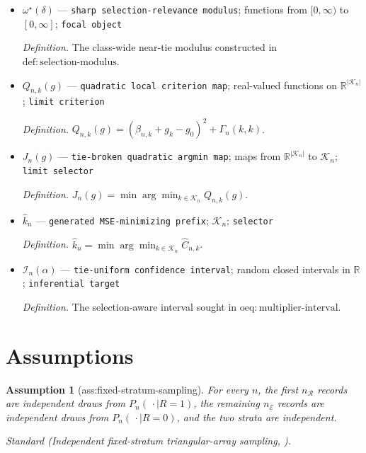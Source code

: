 \documentclass{article}
\newtheorem{assumption}{Assumption}
\begin{document}
\begin{itemize}
  \par\smallskip\noindent\emph{Definition.} \(d_n(k,l)=\|h_{n,k}-h_{n,l}\|_n=\{(\beta_{n,k}-\beta_{n,l})^2+\Gamma_n(k,k)+\Gamma_n(l,l)-2\Gamma_n(k,l)\}^{1/2}\).
  \item \(\omega^{\star}(\delta)\) --- \texttt{sharp selection-\allowbreak{}relevance modulus}; functions from \([0,\infty)\) to \([0,\infty]\); \texttt{focal object}
  \par\smallskip\noindent\emph{Definition.} The class-wide near-tie modulus constructed in \(\mathrm{def:selection\text{-}modulus}\).
  \item \(Q_{n,k}(g)\) --- \texttt{quadratic local criterion map}; real-valued functions on \(\mathbb R^{|\mathcal K_n|}\); \texttt{limit criterion}
  \par\smallskip\noindent\emph{Definition.} \(Q_{n,k}(g)=(\beta_{n,k}+g_k-g_0)^2+\Gamma_n(k,k)\).
  \item \(J_n(g)\) --- \texttt{tie-\allowbreak{}broken quadratic argmin map}; maps from \(\mathbb R^{|\mathcal K_n|}\) to \(\mathcal K_n\); \texttt{limit selector}
  \par\smallskip\noindent\emph{Definition.} \(J_n(g)=\min\arg\min_{k\in\mathcal K_n}Q_{n,k}(g)\).
  \item \(\widehat k_n\) --- \texttt{generated MSE-\allowbreak{}minimizing prefix}; \(\mathcal K_n\); \texttt{selector}
  \par\smallskip\noindent\emph{Definition.} \(\widehat k_n=\min\arg\min_{k\in\mathcal K_n}\widehat C_{n,k}\).
  \item \(\mathcal I_n(\alpha)\) --- \texttt{tie-\allowbreak{}uniform confidence interval}; random closed intervals in \(\mathbb R\); \texttt{inferential target}
  \par\smallskip\noindent\emph{Definition.} The selection-aware interval sought in \(\mathrm{oeq:multiplier\text{-}interval}\).
\end{itemize}

\section{Assumptions}

\begin{assumption}[ass:fixed-stratum-sampling]\label{ass:fixed-stratum-sampling}
For every \(n\), the first \(n_{\mathcal R}\) records are independent draws from \(P_n(\,\cdot\mid R=1)\), the remaining \(n_{\mathcal E}\) records are independent draws from \(P_n(\,\cdot\mid R=0)\), and the two strata are independent.
\par\smallskip\noindent\emph{Standard} (Independent fixed-stratum triangular-array sampling, \cite{YangLiWuYang2026}).
\end{assumption}
\end{document}
